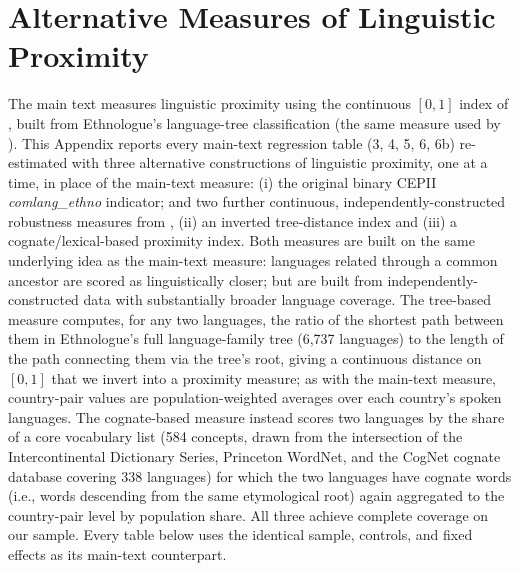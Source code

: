 \documentclass[10pt]{article}
\begin{document}
\section{Alternative Measures of Linguistic Proximity}
\label{app:langprox}

The main text measures linguistic proximity using the continuous $[0,1]$ index of \citet{melitztoubal2014}, built from Ethnologue's language-tree classification (the same measure used by \citet{bekesottaviano2025}). This Appendix reports every main-text regression table (3, 4, 5, 6, 6b) re-estimated with three alternative constructions of linguistic proximity, one at a time, in place of the main-text measure: (i) the original binary CEPII \citep{contecotterlazmayer2022} \textit{comlang\_ethno} indicator; and two further continuous, independently-constructed robustness measures from \citet{psw2024}, (ii) an inverted tree-distance index and (iii) a cognate/lexical-based proximity index. Both \citet{psw2024} measures are built on the same underlying idea as the main-text measure: languages related through a common ancestor are scored as linguistically closer; but are built from independently-constructed data with substantially broader language coverage. The tree-based measure computes, for any two languages, the ratio of the shortest path between them in Ethnologue's full language-family tree (6,737 languages) to the length of the path connecting them via the tree's root, giving a continuous distance on $[0,1]$ that we invert into a proximity measure; as with the main-text measure, country-pair values are population-weighted averages over each country's spoken languages. The cognate-based measure instead scores two languages by the share of a core vocabulary list (584 concepts, drawn from the intersection of the Intercontinental Dictionary Series, Princeton WordNet, and the CogNet cognate database covering 338 languages) for which the two languages have cognate words (i.e., words descending from the same etymological root) again aggregated to the country-pair level by population share. All three achieve complete coverage on our sample. Every table below uses the identical sample, controls, and fixed effects as its main-text counterpart.
\end{document}
